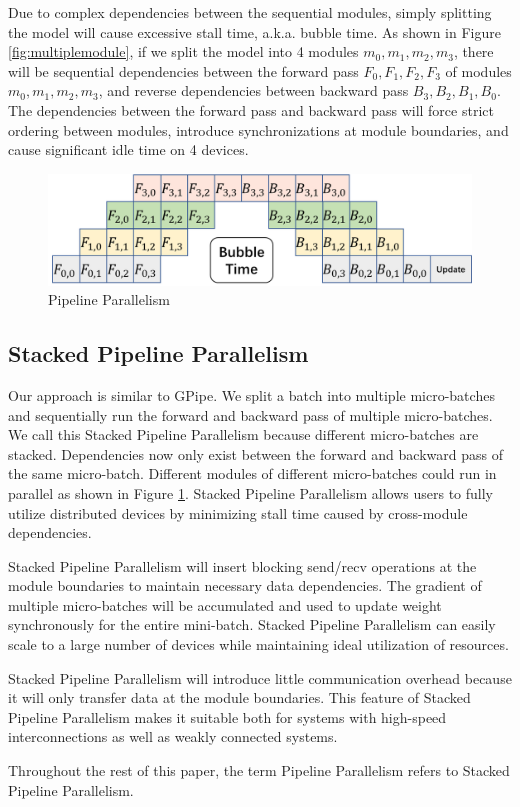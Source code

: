 \documentclass[sigplan, nonacm]{acmart}\settopmatter{printfolios=true,printccs=false,printacmref=false}
\begin{document}
Due to complex dependencies between the sequential modules, simply splitting the model will cause excessive stall time, a.k.a. bubble time. As shown in Figure \ref{fig:multiplemodule}, if we split the model into 4 modules $m_0,m_1,m_2,m_3$, there will be sequential dependencies between the forward pass $F_0, F_1, F_2, F_3$ of modules $m_0,m_1,m_2,m_3$, and reverse dependencies between backward pass $B_3, B_2, B_1, B_0$. The dependencies between the forward pass and backward pass will force strict ordering between modules, introduce synchronizations at module boundaries, and cause significant idle time on 4 devices. \par
 \begin{figure}[htbp]
  \centering
  \includegraphics[scale=0.45]{stackedpipeline}
  \caption{Pipeline Parallelism}
  \label{fig:stackedpipeline}
\end{figure}
\subsection{Stacked Pipeline Parallelism}
Our approach is similar to GPipe\cite{huang2019gpipe}. We split a batch into multiple micro-batches and sequentially run the forward and backward pass of multiple micro-batches. We call this Stacked Pipeline Parallelism because different micro-batches are stacked. Dependencies now only exist between the forward and backward pass of the same micro-batch. Different modules of different micro-batches could run in parallel as shown in Figure \ref{fig:stackedpipeline}. Stacked Pipeline Parallelism allows users to fully utilize distributed devices by minimizing stall time caused by cross-module dependencies. \par
Stacked Pipeline Parallelism will insert blocking send/recv operations at the module boundaries to maintain necessary data dependencies. The gradient of multiple micro-batches will be accumulated and used to update weight synchronously for the entire mini-batch. Stacked Pipeline Parallelism can easily scale to a large number of devices while maintaining ideal utilization of resources.\par
Stacked Pipeline Parallelism will introduce little communication overhead because it will only transfer data at the module boundaries. This feature of Stacked Pipeline Parallelism makes it suitable both for systems with high-speed interconnections as well as weakly connected systems. \par
Throughout the rest of this paper, the term Pipeline Parallelism refers to Stacked Pipeline Parallelism.
\end{document}
